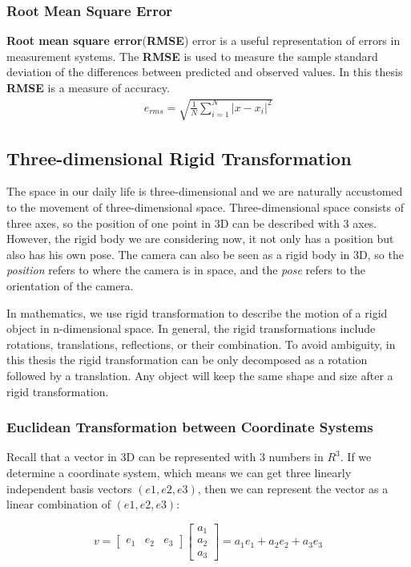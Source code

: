 \subsubsection{Root Mean Square Error}
\textbf{Root mean square error}(\textbf{RMSE}) error is a useful representation of errors in measurement systems. The \textbf{RMSE} is used to measure the sample standard deviation of the differences between predicted and observed values. In this thesis \textbf{RMSE} is a measure of accuracy.
\begin{align*}  
e_{rms} = \sqrt{\frac{1}{N}\sum_{i=1}^{N}|x-x_i|^2}
\end{align*}

\subsection{Three-dimensional Rigid Transformation}
The space in our daily life is three-dimensional and we are naturally accustomed to the movement of three-dimensional space. Three-dimensional space consists of three axes, so the position of one point in 3D can be described with 3 axes. However, the rigid body we are considering now, it not only has a position but also has his own pose. The camera can also be seen as a rigid body in 3D, so the \textit{position} refers to where the camera is in space, and the \textit{pose} refers to the orientation of the camera.

In mathematics, we use rigid transformation to describe the motion of a rigid object in n-dimensional space. In general, the rigid transformations include rotations, translations, reflections, or their combination. To avoid ambiguity, in this thesis the rigid transformation can be only decomposed as a rotation followed by a translation. Any object will keep the same shape and size after a rigid transformation.
 
\subsubsection{Euclidean Transformation between Coordinate Systems}

Recall that a vector in 3D can be represented with 3 numbers in $R^3$. If we determine a coordinate system, which means we can get three linearly independent basis vectors $(e1, e2, e3)$, then we can represent the vector as a linear combination of $(e1, e2, e3)$:

\begin{equation*}
 v = 
     \begin{bmatrix} e_1 & e_2 & e_3 \end{bmatrix} 
     \begin{bmatrix} a_1 \\ a_2 \\ a_3 \end{bmatrix}
   = a_1e_1 + a_2e_2 + a_3e_3               
\end{equation*}

